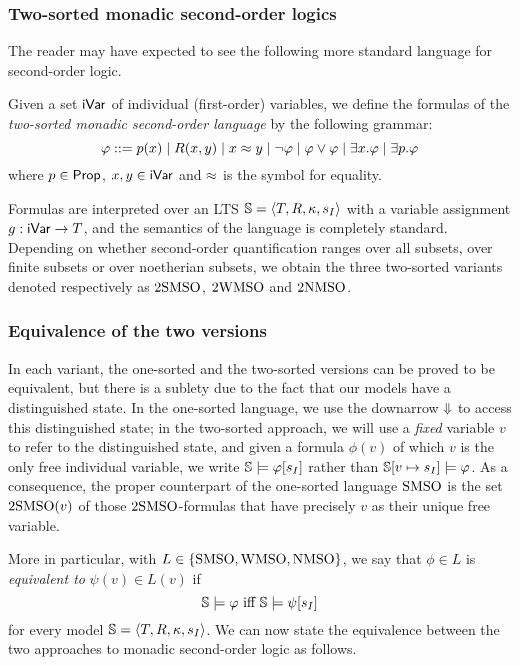 \subsubsection*{Two-sorted monadic second-order logics}
The reader may have expected to see the following more standard language for
second-order logic.
\begin{definition}
\label{def:2mso}
Given a set $\mathsf{iVar}$ of individual (first-order) variables, we define the 
formulas of the \emph{two-sorted monadic second-order language} by the following
grammar:
\[
\varphi \mathrel{::=}  p(x)
\mid R(x,y)
\mid x \approx y
\mid \neg \varphi
\mid \varphi \lor \varphi
\mid \exists x.\varphi
\mid \exists p.\varphi
\]
where $p \in \mathsf{Prop}$, $x,y \in \mathsf{iVar}$ and $\approx$ is the symbol for equality.   
\end{definition}

Formulas are interpreted over an LTS $\mathbb{S} = \langle{T,R,\kappa, s_I}\rangle$ with a
variable assignment $g: \mathsf{iVar} \to T$, and the semantics of the language is
completely standard. 
Depending on whether second-order quantification ranges over all subsets, over 
finite subsets or over noetherian subsets, we obtain the three two-sorted 
variants denoted respectively as $2\mathrm{SMSO}$, $2\mathrm{WMSO}$ and $2\mathrm{NMSO}$.

\subsubsection*{Equivalence of the two versions}
In each variant, the one-sorted and the two-sorted versions can be proved to
be equivalent, but there is a sublety due to the fact that our models have a 
distinguished state.
In the one-sorted language, we use the downarrow $\here$ to access this
distinguished state; in the two-sorted approach, we will use a \emph{fixed}
variable $v$ to refer to the distinguished state, and given a formula 
$\phi(v)$ of which $v$ is the only free individual variable, we write 
$\mathbb{S} \models \varphi[s_{I}]$ rather than $\mathbb{S}[v \mapsto s_{I}] \models \varphi$.
As a consequence, the proper counterpart of the one-sorted language $\mathrm{SMSO}$ is
the set $2\mathrm{SMSO}(v)$ of those $2\mathrm{SMSO}$-formulas that have precisely $v$ 
as their unique free variable.

More in particular, with $L \in \{\mathrm{SMSO}, \mathrm{WMSO}, \mathrm{NMSO}\}$, we say that $\phi \in
L$ is \emph{equivalent to} $\psi(v) \in L(v)$ if
\[
\bbS \models \phi \text{ iff } \bbS \models \psi[s_{I}]
\]
for every model $\mathbb{S} = \langle{T,R,\kappa, s_I}\rangle$.
We can now state the equivalence between the two approaches to 
monadic second-order logic as follows.

